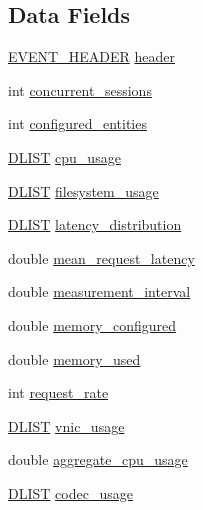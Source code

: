 \subsection*{Data Fields}
\begin{DoxyCompactItemize}
\item 
\hyperlink{evel_8h_aa0ea94c675729365ea7825c4fc7e06d8}{E\+V\+E\+N\+T\+\_\+\+H\+E\+A\+D\+E\+R} \hyperlink{structevent__measurement_a08892ef3b557b44dcc5e203a2bbcc2c4}{header}
\item 
int \hyperlink{structevent__measurement_a96afa2ac61d0fade72e1645a284cfae6}{concurrent\+\_\+sessions}
\item 
int \hyperlink{structevent__measurement_a4cb58272b32e5ec4e49d339f3f7b3677}{configured\+\_\+entities}
\item 
\hyperlink{double__list_8h_a45f4a129042d9e1aa4ffd31fe13e4d14}{D\+L\+I\+S\+T} \hyperlink{structevent__measurement_a1a727089e82e56bdd7d4a3aa6a55fa16}{cpu\+\_\+usage}
\item 
\hyperlink{double__list_8h_a45f4a129042d9e1aa4ffd31fe13e4d14}{D\+L\+I\+S\+T} \hyperlink{structevent__measurement_a7d01f500029deef0550691678f9a4de2}{filesystem\+\_\+usage}
\item 
\hyperlink{double__list_8h_a45f4a129042d9e1aa4ffd31fe13e4d14}{D\+L\+I\+S\+T} \hyperlink{structevent__measurement_a6196660aa48b40e8a571b7d15152c519}{latency\+\_\+distribution}
\item 
double \hyperlink{structevent__measurement_a44f155239afb1b7a2cfeceef685a144d}{mean\+\_\+request\+\_\+latency}
\item 
double \hyperlink{structevent__measurement_a50125c8776bfb0f86393c796b0b99bb2}{measurement\+\_\+interval}
\item 
double \hyperlink{structevent__measurement_a02a3c0c26ddc5861ec0266f13448eb70}{memory\+\_\+configured}
\item 
double \hyperlink{structevent__measurement_a81914f75438f34fd5acc85ad6204e800}{memory\+\_\+used}
\item 
int \hyperlink{structevent__measurement_ab0984600bb4a0701489fdde7d2b147e8}{request\+\_\+rate}
\item 
\hyperlink{double__list_8h_a45f4a129042d9e1aa4ffd31fe13e4d14}{D\+L\+I\+S\+T} \hyperlink{structevent__measurement_a2fcf32022554986d2e7e31cf561abbc4}{vnic\+\_\+usage}
\item 
double \hyperlink{structevent__measurement_a12456548ea1cb226b0e6d6a515732f9c}{aggregate\+\_\+cpu\+\_\+usage}
\item 
\hyperlink{double__list_8h_a45f4a129042d9e1aa4ffd31fe13e4d14}{D\+L\+I\+S\+T} \hyperlink{structevent__measurement_a9ef619061bb0185c063ede94a114a73c}{codec\+\_\+usage}

\end{DoxyCompactItemize}
